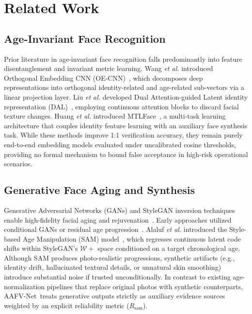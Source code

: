 \documentclass[10pt,journal,compsoc]{IEEEtran}
\newcommand{\sys}{AAFV-Net}
\begin{document}
\section{Related Work}
\label{sec:related_work}

\subsection{Age-Invariant Face Recognition}
Prior literature in age-invariant face recognition falls predominantly into feature disentanglement and invariant metric learning. Wang \emph{et al.} introduced Orthogonal Embedding CNN (OE-CNN)~\cite{wang2018oecnn}, which decomposes deep representations into orthogonal identity-related and age-related sub-vectors via a linear projection layer. Liu \emph{et al.} developed Dual Attention-guided Latent identity representation (DAL)~\cite{liu2019dal}, employing continuous attention blocks to discard facial texture changes. Huang \emph{et al.} introduced MTLFace~\cite{huang2021mtlface}, a multi-task learning architecture that couples identity feature learning with an auxiliary face synthesis task. While these methods improve 1:1 verification accuracy, they remain purely end-to-end embedding models evaluated under uncalibrated cosine thresholds, providing no formal mechanism to bound false acceptance in high-risk operational scenarios.

\subsection{Generative Face Aging and Synthesis}
Generative Adversarial Networks (GANs) and StyleGAN inversion techniques enable high-fidelity facial aging and rejuvenation~\cite{karras2020stylegan2}. Early approaches utilized conditional GANs or residual age progression~\cite{he2019defrcn}. Alaluf \emph{et al.} introduced the Style-based Age Manipulation (SAM) model~\cite{alaluf2021sam}, which regresses continuous latent code shifts within StyleGAN's $\mathcal{W}+$ space conditioned on a target chronological age. Although SAM produces photo-realistic progressions, synthetic artifacts (e.g., identity drift, hallucinated textural details, or unnatural skin smoothing) introduce substantial noise if trusted unconditionally. In contrast to existing age-normalization pipelines that replace original photos with synthetic counterparts, \sys\ treats generative outputs strictly as auxiliary evidence sources weighted by an explicit reliability metric ($R_{\text{sam}}$).
\end{document}
